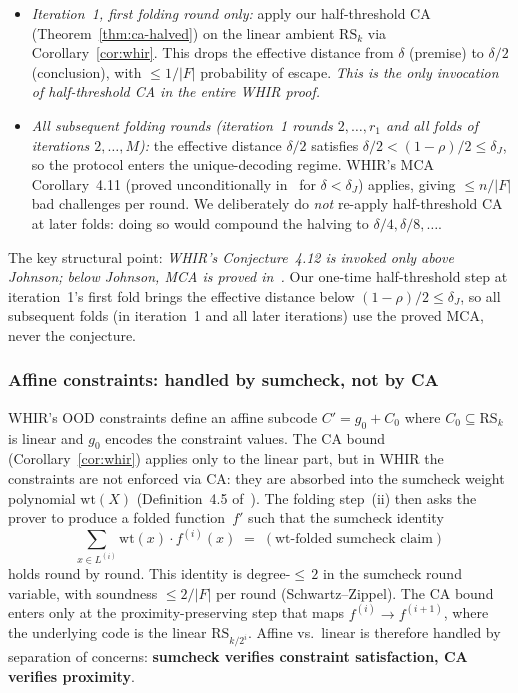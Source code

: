 \documentclass[11pt]{article}
\newcommand{\RS}{\mathrm{RS}}
\begin{document}
\begin{itemize}[nosep]
\item \emph{Iteration~1, first folding round only:} apply our half-threshold CA (Theorem~\ref{thm:ca-halved}) on the linear ambient $\RS_k$ via Corollary~\ref{cor:whir}. This drops the effective distance from $\delta$ (premise) to $\delta/2$ (conclusion), with $\leq 1/|F|$ probability of escape. \emph{This is the only invocation of half-threshold CA in the entire WHIR proof.}
\item \emph{All subsequent folding rounds (iteration~1 rounds $2, \ldots, r_1$ and \emph{all} folds of iterations $2, \ldots, M$):} the effective distance $\delta/2$ satisfies $\delta/2 < (1{-}\rho)/2 \leq \delta_J$, so the protocol enters the unique-decoding regime. WHIR's MCA Corollary~4.11 (proved unconditionally in~\cite{WHIR} for $\delta < \delta_J$) applies, giving $\leq n/|F|$ bad challenges per round. We deliberately do \emph{not} re-apply half-threshold CA at later folds: doing so would compound the halving to $\delta/4, \delta/8, \ldots$.
\end{itemize}

The key structural point: \emph{WHIR's Conjecture~4.12 is invoked only above Johnson; below Johnson, MCA is proved in~\cite{WHIR}.} Our one-time half-threshold step at iteration~1's first fold brings the effective distance below $(1{-}\rho)/2 \leq \delta_J$, so all subsequent folds (in iteration~1 and all later iterations) use the proved MCA, never the conjecture.

\subsubsection*{Affine constraints: handled by sumcheck, not by CA}

WHIR's OOD constraints define an affine subcode $C' = g_0 + C_0$ where $C_0 \subseteq \RS_k$ is linear and $g_0$ encodes the constraint values. The CA bound (Corollary~\ref{cor:whir}) applies only to the linear part, but in WHIR the constraints are not enforced via CA: they are absorbed into the sumcheck weight polynomial $\mathrm{wt}(X)$ (Definition~4.5 of~\cite{WHIR}). The folding step~(ii) then asks the prover to produce a folded function~$f'$ such that the sumcheck identity
$$\sum_{x \in L^{(i)}} \mathrm{wt}(x) \cdot f^{(i)}(x) \;=\; (\mathrm{wt}\text{-folded sumcheck claim})$$
holds round by round. This identity is degree-${\leq}\,2$ in the sumcheck round variable, with soundness $\leq 2/|F|$ per round (Schwartz--Zippel). The CA bound enters only at the proximity-preserving step that maps $f^{(i)} \to f^{(i+1)}$, where the underlying code is the linear $\RS_{k/2^i}$. Affine vs.\ linear is therefore handled by separation of concerns: \textbf{sumcheck verifies constraint satisfaction, CA verifies proximity}.
\end{document}
